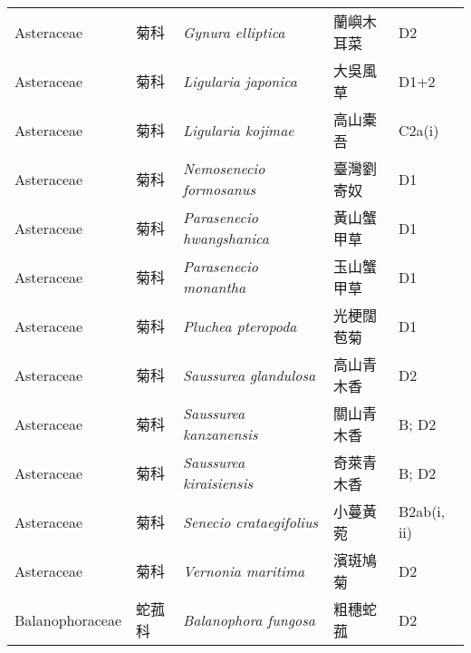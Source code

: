 {\begin{longtable}{p{2.5cm}p{2.5cm}p{4.5cm}p{2.5cm}p{3cm}}
    Asteraceae & 菊科 & \textit{Gynura elliptica}  & 蘭嶼木耳菜 & D2 \index{Gynura@\textit{Gynura}!elliptica@\textit{elliptica}}  \index{蘭嶼木耳菜} \\
    Asteraceae & 菊科 & \textit{Ligularia japonica}  & 大吳風草 & D1+2 \index{Ligularia@\textit{Ligularia}!japonica@\textit{japonica}}  \index{大吳風草} \\
    Asteraceae & 菊科 & \textit{Ligularia kojimae}  & 高山橐吾 & C2a(i) \index{Ligularia@\textit{Ligularia}!kojimae@\textit{kojimae}}  \index{高山橐吾} \\
    Asteraceae & 菊科 & \textit{Nemosenecio formosanus}  & 臺灣劉寄奴 & D1 \index{Nemosenecio@\textit{Nemosenecio}!formosanus@\textit{formosanus}}  \index{臺灣劉寄奴} \\
    Asteraceae & 菊科 & \textit{Parasenecio hwangshanica}  & 黃山蟹甲草 & D1 \index{Parasenecio@\textit{Parasenecio}!hwangshanica@\textit{hwangshanica}}  \index{黃山蟹甲草} \\
    Asteraceae & 菊科 & \textit{Parasenecio monantha}  & 玉山蟹甲草 & D1 \index{Parasenecio@\textit{Parasenecio}!monantha@\textit{monantha}}  \index{玉山蟹甲草} \\
    Asteraceae & 菊科 & \textit{Pluchea pteropoda}  & 光梗闊苞菊 & D1 \index{Pluchea@\textit{Pluchea}!pteropoda@\textit{pteropoda}}  \index{光梗闊苞菊} \\
    Asteraceae & 菊科 & \textit{Saussurea glandulosa}  & 高山青木香 & D2 \index{Saussurea@\textit{Saussurea}!glandulosa@\textit{glandulosa}}  \index{高山青木香} \\
    Asteraceae & 菊科 & \textit{Saussurea kanzanensis}  & 關山青木香 & B; D2 \index{Saussurea@\textit{Saussurea}!kanzanensis@\textit{kanzanensis}}  \index{關山青木香} \\
    Asteraceae & 菊科 & \textit{Saussurea kiraisiensis}  & 奇萊青木香 & B; D2 \index{Saussurea@\textit{Saussurea}!kiraisiensis@\textit{kiraisiensis}}  \index{奇萊青木香} \\
    Asteraceae & 菊科 & \textit{Senecio crataegifolius}  & 小蔓黃菀 & B2ab(i, ii) \index{Senecio@\textit{Senecio}!crataegifolius@\textit{crataegifolius}}  \index{小蔓黃菀} \\
    Asteraceae & 菊科 & \textit{Vernonia maritima}  & 濱斑鳩菊 & D2 \index{Vernonia@\textit{Vernonia}!maritima@\textit{maritima}}  \index{濱斑鳩菊} \\
    Balanophoraceae & 蛇菰科 & \textit{Balanophora fungosa}  & 粗穗蛇菰 & D2 \index{Balanophora@\textit{Balanophora}!fungosa@\textit{fungosa}}  \index{粗穗蛇菰} \\

\end{longtable}}
